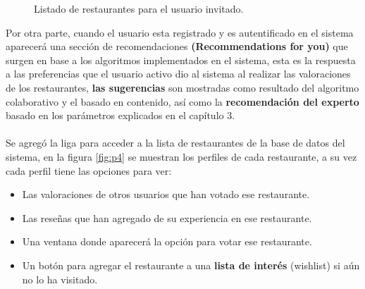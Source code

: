 \documentclass[12pt,letterpaper,oneside] {memoir}
\begin{document}
\begin{figure}[H]
\centering 
{} \caption{Listado de restaurantes para el usuario invitado.} 
\label{fig:p3} 
\end{figure}

Por otra parte, cuando el usuario esta registrado y es autentificado en el sistema aparecerá una sección de recomendaciones \textbf{(Recommendations for you)} que surgen en base a los algoritmos implementados en el sistema, esta es la respuesta a las preferencias que el usuario activo dio al sistema al realizar las valoraciones de los restaurantes, \textbf{las sugerencias} son mostradas como resultado del algoritmo colaborativo y el basado en contenido, así como la \textbf{recomendación del experto} basado en los parámetros explicados en el capítulo 3.
\paragraph{}
Se agregó la liga para acceder a la lista de restaurantes de la base de datos del sistema, en la figura \ref{fig:p4} se muestran los perfiles de cada restaurante, a su vez cada perfil tiene las opciones para  ver:
\begin{itemize}
\item Las valoraciones de otros usuarios que han votado ese restaurante.
\item Las reseñas que han agregado de su experiencia en ese restaurante.
\item Una ventana donde aparecerá la opción para votar ese restaurante.
\item Un botón para agregar el restaurante a una \textbf{lista de interés} (wishlist) si aún no lo ha visitado.
\end{itemize}
\end{document}
